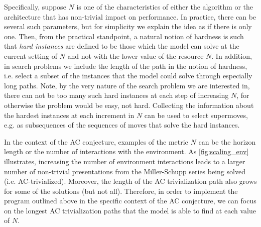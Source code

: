 Specifically, suppose $N$ is one of the characteristics of either the algorithm or the architecture that has non-trivial impact on performance. In practice, there can be several such parameters, but for simplicity we explain the idea as if there is only one. Then, from the practical standpoint, a natural notion of hardness is such that \textit{hard instances} are defined to be those which the model can solve at the current setting of $N$ and not with the lower value of the resource $N$. In addition, in search problems we include the length of the path in the notion of hardness, i.e. select a subset of the instances that the model could solve through especially long paths. Note, by the very nature of the search problem we are interested in, there can not be too many such hard instances at each step of increasing $N$, for otherwise the problem would be easy, not hard. Collecting the information about the hardest instances at each increment in $N$ can be used to select supermoves, e.g. as subsequences of the sequences of moves that solve the hard instances.

In the context of the AC conjecture, examples of the metric $N$ can be the horizon length or the number of interactions with the environment. As \autoref{fig:scaling_env} illustrates, increasing the number of environment interactions leads to a larger number of non-trivial presentations from the Miller-Schupp series being solved (i.e. AC-trivialized). Moreover, the length of the AC trivialization path also grows for some of the solutions (but not all).
%
Therefore, in order to implement the program outlined above in the specific context of the AC conjecture, we can focus on the longest AC trivialization paths that the model is able to find at each value of $N$.


